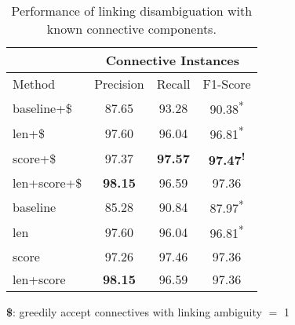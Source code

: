 \begin{table}[!htbp]
\centering
\begin{tabular}{|l|c|c|c|}
\hline
                        & \multicolumn{3}{c|}{Connective Instances}                 \\ \hline
Method                  &     Precision &     Recall &     F1-Score                 \\ \hline
baseline+\$             &     87.65     &     93.28  &     90.38\textsuperscript{*} \\ \hline
len+\$                  &     97.60     &     96.04  &     96.81\textsuperscript{*} \\ \hline
score+\$                &     97.37     & \bf 97.57  & \bf 97.47\textsuperscript{!} \\ \hline
len+score+\$            & \bf 98.15     &     96.59  &     97.36\textsuperscript{ } \\


\hhline{|=|=|=|=|}

baseline                &     85.28     &     90.84  &     87.97\textsuperscript{*} \\ \hline
len                     &     97.60     &     96.04  &     96.81\textsuperscript{*} \\ \hline
score                   &     97.26     &     97.46  &     97.36\textsuperscript{ } \\ \hline
len+score               & \bf 98.15     &     96.59  &     97.36\textsuperscript{ } \\ \hline

\end{tabular}
\begin{flushleft}
\small
\textbf{\$}: greedily accept connectives with linking ambiguity $=$ 1
\end{flushleft}
\caption{\label{t:linking-perfect-methods} Performance of linking
disambiguation with known connective components. }
\end{table}

